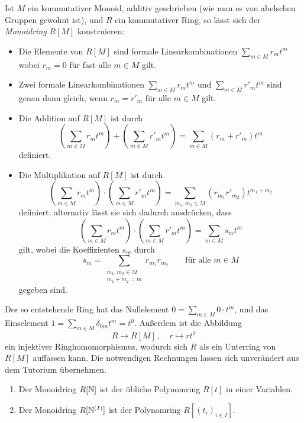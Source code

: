 Ist $M$ ein kommutativer Monoid, additiv geschrieben (wie man es von abelschen Gruppen gewohnt ist), und $R$ ein kommutativer Ring, so lässt sich der \emph{Monoidring} $R[M]$ konstruieren:
\begin{itemize}
  \item
    Die Elemente von $R[M]$ sind formale Linearkombinationen $\sum_{m \in M} r_m t^m$ wobei $r_m = 0$ für fast alle $m \in M$ gilt.
  \item
    Zwei formale Linearkombinationen $\sum_{m \in M} r_m t^m$ und $\sum_{m \in M} r'_m t^m$ sind genau dann gleich, wenn $r_m = r'_m$ für alle $m \in M$ gilt.
  \item
    Die Addition auf $R[M]$ ist durch
    \[
        \left( \sum_{m \in M} r_m t^m \right) + \left( \sum_{m \in M} r'_m t^m \right)
      = \sum_{m \in M} (r_m + r'_m) t^m
    \]
    definiert.
  \item
    Die Multiplikation auf $R[M]$ ist durch
    \[
        \left( \sum_{m \in M} r_m t^m \right) \cdot \left( \sum_{m \in M} r'_m t^m \right)
      = \sum_{m_1, m_2 \in M} (r_{m_1} r'_{m_2}) t^{m_1 + m_2}
    \]
    definiert;
    alternativ lässt sie sich dadurch ausdrücken, dass
    \[
        \left( \sum_{m \in M} r_m t^m \right) \cdot \left( \sum_{m \in M} r'_m t^m \right)
      = \sum_{m \in M} s_m t^m
    \]
    gilt, wobei die Koeffizienten $s_m$ durch
    \[
        s_m
      = \sum_{\substack{m_1, m_2 \in M \\ m_1 + m_2 = m}} r_{m_1} r_{m_2}
      \qquad
      \text{für alle $m \in M$}
    \]
    gegeben sind.
\end{itemize}

Der so entstehende Ring hat das Nullelement $0 = \sum_{m \in M} 0 \cdot t^m$, und das Einselement $1 = \sum_{m \in M} \delta_{0m} t^m = t^0$.
Außerdem ist die Abbildung
\[
          R
  \to     R[M] \,,
  \quad   r
  \mapsto r t^0
\]
ein injektiver Ringhomomorphismus, wodurch sich $R$ als ein Unterring von $R[M]$ auffassen kann.
Die notwendigen Rechnungen lassen sich unverändert aus dem Tutorium übernehmen.

\begin{example}
  \leavevmode
  \begin{enumerate}
    \item
      Der Monoidring $R[\mathbb{N}]$ ist der übliche Polynomring $R[t]$ in einer Variablen.
    \item
      Der Monoidring $R[\mathbb{N}^{(I)}]$ ist der Polynomring $R[(t_i)_{i \in I}]$.
  \end{enumerate}
\end{example}

